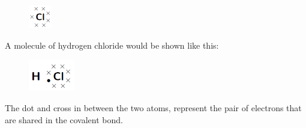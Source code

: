       \label{m38701*id140154}
    \setcounter{subfigure}{0}
	\begin{figure}[H] %
    \begin{center}
    \label{m38701*id140157!!!underscore!!!media}\label{m38701*id140157!!!underscore!!!printimage}\includegraphics[width=1cm]{col11305.imgs/m38701_CG11C1_007.png} %
      \vspace{2pt}
    \vspace{.1in}
    \end{center}
 \end{figure}       
      \par 
      \label{m38701*id140164}A molecule of hydrogen chloride would be shown like this:\par 
      \label{m38701*id140168}
    \setcounter{subfigure}{0}
	\begin{figure}[H] %
    \begin{center}
    \label{m38701*id140171!!!underscore!!!media}\label{m38701*id140171!!!underscore!!!printimage}\includegraphics[width=2cm]{col11305.imgs/m38701_CG11C1_008.png} %
      \vspace{2pt}
    \vspace{.1in}
    \end{center}
 \end{figure}       
      \par 
      \label{m38701*id140178}The dot and cross in between the two atoms, represent the pair of electrons that are shared in the covalent bond.\par 
\label{m38701*secfhsst!!!underscore!!!id219}\vspace{.5cm} 
      \noindent
